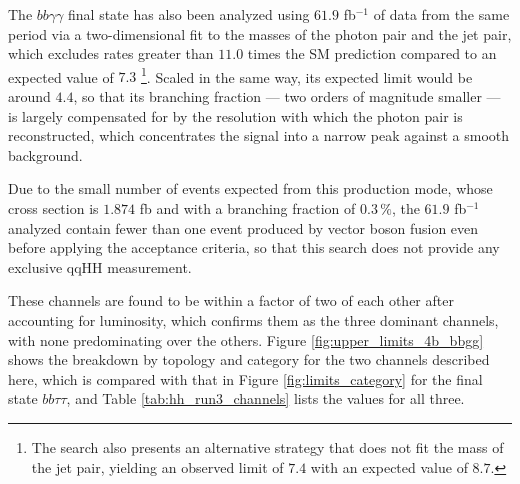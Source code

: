 The $bb\gamma\gamma$ final state has also been analyzed using $61.9$ fb$^{-1}$ of data from the same period via a two-dimensional fit to the masses of the photon pair and the jet pair, which excludes rates greater than $11.0$ times the SM prediction compared to an expected value of $7.3$ \cite{CMS-PAS-HIG-25-007}\footnote{The search also presents an alternative strategy that does not fit the mass of the jet pair, yielding an observed limit of $7.4$ with an expected value of $8.7$.}. Scaled in the same way, its expected limit would be around $4.4$, so that its branching fraction — two orders of magnitude smaller — is largely compensated for by the resolution with which the photon pair is reconstructed, which concentrates the signal into a narrow peak against a smooth background.

Due to the small number of events expected from this production mode, whose cross section is $1.874$ fb and with a branching fraction of $0.3\,\%$, the $61.9$ fb$^{-1}$ analyzed contain fewer than one event produced by vector boson fusion even before applying the acceptance criteria, so that this search does not provide any exclusive qqHH measurement.\medskip

These channels are found to be within a factor of two of each other after accounting for luminosity, which confirms them as the three dominant channels, with none predominating over the others. Figure \ref{fig:upper_limits_4b_bbgg} shows the breakdown by topology and category for the two channels described here, which is compared with that in Figure \ref{fig:limits_category} for the final state $bb\tau\tau$, and Table \ref{tab:hh_run3_channels} lists the values for all three.

